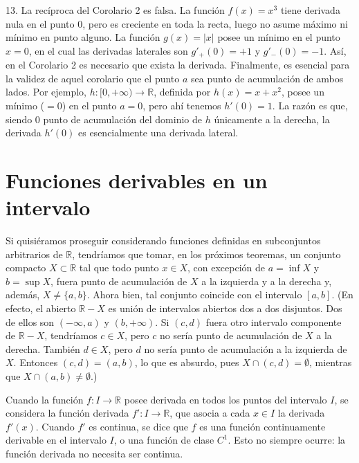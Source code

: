 \documentclass[12pt,oneside]{book}
\begin{document}
13. La recíproca del Corolario 2 es falsa. La función \( f(x) = x^3 \) tiene derivada nula en el punto \( 0 \), pero es creciente en toda la recta, luego no asume máximo ni mínimo en punto alguno. La función \( g(x) = |x| \) posee un mínimo en el punto \( x = 0 \), en el cual las derivadas laterales son \( g'_+(0) = +1 \) y \( g'_-(0) = -1 \). Así, en el Corolario 2 es necesario que exista la derivada. Finalmente, es esencial para la validez de aquel corolario que el punto \( a \) sea punto de acumulación de ambos lados. Por ejemplo, \( h: [0, +\infty) \to \mathbb{R} \), definida por \( h(x) = x + x^2 \), posee un mínimo (\( = 0 \)) en el punto \( a = 0 \), pero ahí tenemos \( h'(0) = 1 \). La razón es que, siendo \( 0 \) punto de acumulación del dominio de \( h \) únicamente a la derecha, la derivada \( h'(0) \) es esencialmente una derivada lateral.

\section{Funciones derivables en un intervalo}

Si quisiéramos proseguir considerando funciones definidas en subconjuntos arbitrarios de \( \mathbb{R} \), tendríamos que tomar, en los próximos teoremas, un conjunto compacto \( X \subset \mathbb{R} \) tal que todo punto \( x \in X \), con excepción de \( a = \inf X \) y \( b = \sup X \), fuera punto de acumulación de \( X \) a la izquierda y a la derecha y, además, \( X \neq \{a, b\} \). Ahora bien, tal conjunto coincide con el intervalo \( [a, b] \). (En efecto, el abierto \( \mathbb{R} - X \) es unión de intervalos abiertos dos a dos disjuntos. Dos de ellos son \( (-\infty, a) \) y \( (b, +\infty) \). Si \( (c, d) \) fuera otro intervalo componente de \( \mathbb{R} - X \), tendríamos \( c \in X \), pero \( c \) no sería punto de acumulación de \( X \) a la derecha. También \( d \in X \), pero \( d \) no sería punto de acumulación a la izquierda de \( X \). Entonces \( (c, d) = (a, b) \), lo que es absurdo, pues \( X \cap (c, d) = \emptyset \), mientras que \( X \cap (a, b) \neq \emptyset \).)

Cuando la función \( f: I \to \mathbb{R} \) posee derivada en todos los puntos del intervalo \( I \), se considera la función derivada \( f': I \to \mathbb{R} \), que asocia a cada \( x \in I \) la derivada \( f'(x) \). Cuando \( f' \) es continua, se dice que \( f \) es una función continuamente derivable en el intervalo \( I \), o una función de clase \( C^1 \). Esto no siempre ocurre: la función derivada no necesita ser continua.
\end{document}
